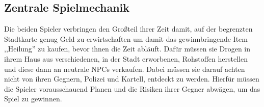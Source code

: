 \subsection{Zentrale Spielmechanik}\label{subsec:zentrale-spielmechanik}

Die beiden Spieler verbringen den Großteil ihrer Zeit damit, auf der begrenzten Stadtkarte genug Geld zu erwirtschaften um damit das gewinnbringende Item ,,Heilung'' zu kaufen, bevor ihnen die Zeit abläuft.
Dafür müssen sie Drogen in ihrem Haus aus verschiedenen, in der Stadt erworbenen, Rohstoffen herstellen und diese dann an neutrale NPCs verkaufen.
Dabei müssen sie darauf achten nicht von ihren Gegnern, Polizei und Kartell, entdeckt zu werden.
Hierfür müssen die Spieler vorausschauend Planen und die Risiken ihrer Gegner abwägen, um das Spiel zu gewinnen.
